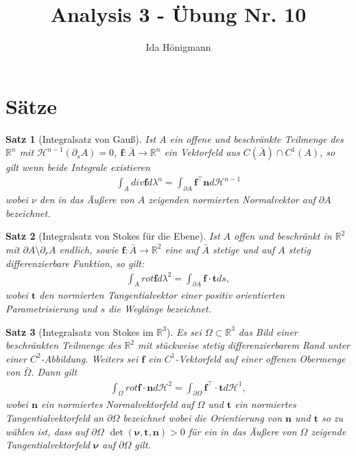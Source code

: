 \documentclass[]{article}
\title{Analysis 3 - Übung Nr. 10}
\author{Ida Hönigmann}
\newtheorem*{theorem*}{Satz}
\begin{document}
\maketitle

\section{Sätze}

\begin{theorem*}[Integralsatz von Gauß]
	Ist $A$ ein offene und beschränkte Teilmenge des $\mathbb{R}^n$ mit $\mathcal{H}^{n-1}(\partial_sA)=0$, $\bm{f}:\bar{A}\rightarrow\mathbb{R}^n$ ein Vektorfeld aus $C(\bar{A})\cap C^1(A)$, so gilt wenn beide Integrale existieren
	\begin{align*}
		\int_A div\bm{f} d\lambda^n = \int_{\partial A} \bm{f}^\top \bm{n} d\mathcal{H}^{n-1}
	\end{align*}
	wobei $\nu$ den in das Äußere von $A$ zeigenden normierten Normalvektor auf $\partial A$ bezeichnet.
\end{theorem*}

\begin{theorem*}[Integralsatz von Stokes für die Ebene]
	Ist $A$ offen und beschränkt in $\mathbb{R}^2$ mit $\partial A \setminus \partial_r A$ endlich, sowie $\bm{f}:\bar{A}\rightarrow\mathbb{R}^2$ eine auf $\bar{A}$ stetige und auf $A$ stetig differenzierbare Funktion, so gilt:
	\begin{align*}
		\int_A rot\bm{f} d\lambda^2 = \int_{\partial A} \bm{f}\cdot \bm{t} ds,
	\end{align*}
	wobei $\bm{t}$ den normierten Tangentialvektor einer positiv orientierten Parametrisierung und $s$ die Weglänge bezeichnet.
\end{theorem*}

\begin{theorem*}[Integralsatz von Stokes im $\mathbb{R}^3$]
	Es sei $\Omega \subset \mathbb{R}^3$ das Bild einer beschränkten Teilmenge des $\mathbb{R}^2$ mit stückweise stetig differenzierbarem Rand unter einer $C^2$-Abbildung. Weiters sei $\bm{f}$ ein $C^1$-Vektorfeld auf einer offenen Obermenge von $\bar{\Omega}$. Dann gilt
	\begin{align*}
		\int_\Omega rot\bm{f}\cdot\bm{n}d\mathcal{H}^2 = \int_{\partial\Omega} \bm{f}^\top \cdot \bm{t} d\mathcal{H}^1,
	\end{align*}
	wobei $\bm{n}$ ein normiertes Normalvektorfeld auf $\Omega$ und $\bm{t}$ ein normiertes Tangentialvektorfeld an $\partial\Omega$ bezeichnet wobei die Orientierung von $\bm{n}$ und $\bm{t}$ so zu wählen ist, dass auf $\partial\Omega$ $\det(\bm{\nu}, \bm{t}, \bm{n}) > 0$ für ein in das Äußere von $\Omega$ zeigende Tangentialvektorfeld $\bm{\nu}$ auf $\partial\Omega$ gilt.
\end{theorem*}
\newpage
\end{document}
